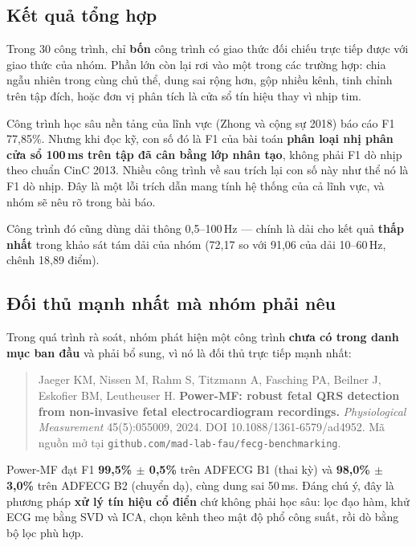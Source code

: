 \subsection{Kết quả tổng hợp}

Trong 30 công trình, chỉ \textbf{bốn} công trình có giao thức đối chiếu trực tiếp được với giao thức của
nhóm. Phần lớn còn lại rơi vào một trong các trường hợp: chia ngẫu nhiên trong cùng chủ thể, dung sai
rộng hơn, gộp nhiều kênh, tinh chỉnh trên tập đích, hoặc đơn vị phân tích là cửa sổ tín hiệu thay vì
nhịp tim.

\begin{ghichu}[title={Phát hiện đáng chú ý nhất khi đọc y văn}]
Công trình học sâu nền tảng của lĩnh vực (Zhong và cộng sự 2018) báo cáo F1 77,85\%. Nhưng khi đọc kỹ,
con số đó là F1 của bài toán \textbf{phân loại nhị phân cửa sổ 100\,ms trên tập đã cân bằng lớp nhân tạo},
không phải F1 dò nhịp theo chuẩn CinC 2013. Nhiều công trình về sau trích lại con số này như thể nó là
F1 dò nhịp. Đây là một lỗi trích dẫn mang tính hệ thống của cả lĩnh vực, và nhóm sẽ nêu rõ trong bài báo.

Công trình đó cũng dùng dải thông 0,5--100\,Hz --- chính là dải cho kết quả \textbf{thấp nhất} trong
khảo sát tám dải của nhóm (72,17 so với 91,06 của dải 10--60\,Hz, chênh 18,89 điểm).
\end{ghichu}



\subsection{Đối thủ mạnh nhất mà nhóm phải nêu}

Trong quá trình rà soát, nhóm phát hiện một công trình \textbf{chưa có trong danh mục ban đầu} và phải
bổ sung, vì nó là đối thủ trực tiếp mạnh nhất:

\begin{quote}
\small
Jaeger KM, Nissen M, Rahm S, Titzmann A, Fasching PA, Beilner J, Eskofier BM, Leutheuser H.
\textbf{Power-MF: robust fetal QRS detection from non-invasive fetal electrocardiogram recordings.}
\textit{Physiological Measurement} 45(5):055009, 2024. DOI 10.1088/1361-6579/ad4952.
Mã nguồn mở tại \texttt{github.com/mad-lab-fau/fecg-benchmarking}.
\end{quote}

Power-MF đạt F1 \textbf{99,5\% $\pm$ 0,5\%} trên ADFECG B1 (thai kỳ) và \textbf{98,0\% $\pm$ 3,0\%} trên
ADFECG B2 (chuyển dạ), cùng dung sai 50\,ms. Đáng chú ý, đây là phương pháp \textbf{xử lý tín hiệu cổ điển}
chứ không phải học sâu: lọc đạo hàm, khử ECG mẹ bằng SVD và ICA, chọn kênh theo mật độ phổ công suất,
rồi dò bằng bộ lọc phù hợp.


